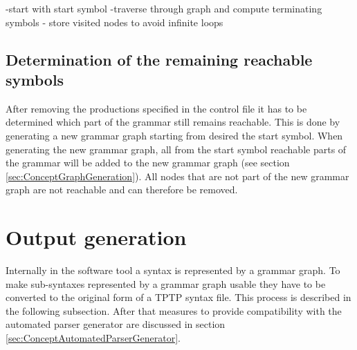 -start with start symbol
-traverse through graph and compute terminating symbols
- store visited nodes to avoid infinite loops

\subsection{Determination of the remaining reachable symbols}\label{sec:ConceptDerterminingRemainingReachable}
After removing the productions specified in the control file it has to be determined which part of the grammar still remains reachable.
This is done by generating a new grammar graph starting from desired the start symbol.
When generating the new grammar graph, all from the start symbol reachable parts of the grammar will be added to the new grammar graph (see section \ref{sec:ConceptGraphGeneration}).
All nodes that are not part of the new grammar graph are not reachable and can therefore be removed.

\section{Output generation}\label{sec:ConceptOutputGeneration}
Internally in the software tool a syntax is represented by a grammar graph.
To make sub-syntaxes represented by a grammar graph usable they have to be converted to the original form of a \ac{TPTP} syntax file. This process is described in the following subsection.
After that measures to provide compatibility with the automated parser generator are discussed in section \ref{sec:ConceptAutomatedParserGenerator}.

